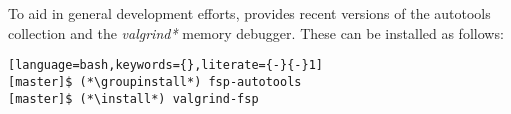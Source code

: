 To aid in general development efforts, \FSP{} provides recent versions of the \GNU{}
autotools collection and the {\em valgrind*} memory debugger. These can be installed as follows:

\begin{lstlisting}[language=bash,keywords={},literate={-}{-}1]
[master]$ (*\groupinstall*) fsp-autotools
[master]$ (*\install*) valgrind-fsp
\end{lstlisting}
